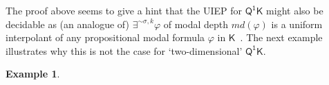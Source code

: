 \documentclass[10pt,a4paper]{amsart}
\theoremstyle{plain}
\theoremstyle{definition}
\newtheorem{exa}[thm]{Example}
\newcommand{\nb}[1]{\textcolor{red}{\bf!}%
	\marginpar[\parbox{15mm}{\raggedleft\scriptsize\textcolor{red}{#1}}]%
	{\parbox{15mm}{\raggedright\scriptsize\textcolor{red}{#1}}}}
\newcommand{\md}{\textit{md}}
\newcommand{\FOMK}{\ensuremath{\mathsf{Q^1K}}}
\newcommand{\fform}[1]{\boldsymbol{#1}}
\newcommand{\avar}{\fform{a}}
\newcommand{\bvar}{\fform{b}}
\newcommand{\hvar}{\fform{h}}
\begin{document}
The proof above seems to give a hint that the UIEP for \FOMK{} might also be decidable as (an analogue of) $\exists^{\sim\sigma,k}\varphi$ of modal depth $\md(\varphi)$ is a uniform interpolant of any propositional modal formula $\varphi$ in $\mathsf{K}$~\cite{Visser96}. The next example illustrates why this is not the case for `two-dimensional' $\FOMK$.

\begin{exa}\label{exK}


\end{exa}
\end{document}
